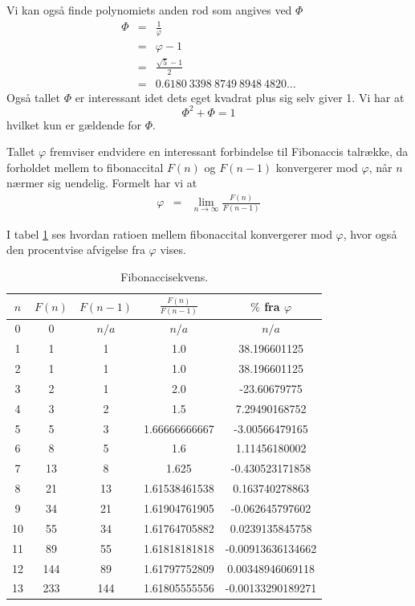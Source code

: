 {Vi kan også finde polynomiets anden rod som angives ved $\varPhi$
\begin{eqnarray}
	\varPhi & = & \frac{1}{\varphi} \\
		& = & \varphi - 1 \\
        & = & \frac{\sqrt{5} - 1}{2} \\
		& = & 0.6180\ 3398\ 8749\ 8948\ 4820 \dots
		\label{mange_tal}
\end{eqnarray}
Også tallet $\varPhi$ er interessant idet dets eget kvadrat plus sig
selv giver 1. Vi har at
\begin{equation}
	\varPhi^{2} + \varPhi = 1
	\label{Phi_squared}
\end{equation}
hvilket kun er gældende for $\varPhi$.

Tallet $\varphi$ fremviser endvidere en interessant forbindelse til
Fibonaccis talrække, da forholdet mellem to fibonaccital $F(n)$ og $F(n
- 1)$ konvergerer mod $\varphi$, når $n$ nærmer sig uendelig. Formelt har
vi at
\begin{eqnarray*}
	\varphi & =     & \lim_{n \rightarrow\infty}{\frac{F(n)}{F(n - 1)}}
\end{eqnarray*}

I tabel \ref{fibonacci_sequence} ses hvordan ratioen mellem fibonaccital
konvergerer mod $\varphi$, hvor også den procentvise afvigelse fra
$\varphi$ vises.

\begin{table}[h!]
    \centering
    \begin{tabular}{|c|c|c|c|c|}
        \hline
        $n$ & $F(n)$ & $F(n - 1)$ & $ \frac{F(n)}{F(n - 1)}$ & $\%$ fra $\varphi$ \\
        \hline
        0	 & 0 	 & $n/a$ & $n/a$ 		& $n/a$ 		\\
        1	 & 1	 & 1	 & 1.0		 	& 38.196601125 		\\
        2	 & 1	 & 1	 & 1.0		 	& 38.196601125 		\\
        3	 & 2	 & 1	 & 2.0		 	& -23.60679775 		\\
        4	 & 3	 & 2	 & 1.5			& 7.29490168752 	\\
        5	 & 5	 & 3	 & 1.66666666667	& -3.00566479165 	\\
        6	 & 8	 & 5	 & 1.6			& 1.11456180002 	\\
        7	 & 13	 & 8	 & 1.625	 	& -0.430523171858 	\\
        8	 & 21	 & 13	 & 1.61538461538	& 0.163740278863 	\\
        9	 & 34	 & 21	 & 1.61904761905	& -0.062645797602 	\\
        10	 & 55	 & 34	 & 1.61764705882	& 0.0239135845758 	\\
        11	 & 89	 & 55	 & 1.61818181818	& -0.00913636134662 	\\
        12	 & 144	 & 89	 & 1.61797752809	& 0.00348946069118 	\\
        13	 & 233	 & 144	 & 1.61805555556	& -0.00133290189271 	\\
        \hline
    \end{tabular}
    \caption{Fibonaccisekvens.}
    \label{fibonacci_sequence}
\end{table}

}
